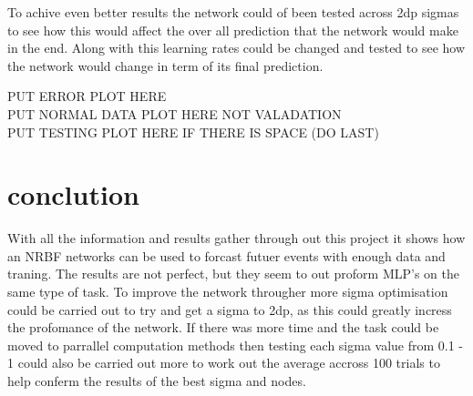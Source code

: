 \documentclass{IEEEtran}[11pt]
\begin{document}
\begin{flushleft}
 To achive even better results the network could of been tested across 2dp sigmas
 to see how this would affect the over all prediction that the network would
 make in the end. Along with this learning rates could be changed and tested to
 see how the network would change in term of its final prediction.
 \\
 \vspace{1.5mm}

  PUT ERROR PLOT HERE
  \\
  \vspace{5mm}
  PUT NORMAL DATA PLOT HERE NOT VALADATION
  \\
  \vspace{5mm}
  PUT TESTING PLOT HERE IF THERE IS SPACE (DO LAST)
\end{flushleft}

\section{conclution}
\begin{flushleft}
 With all the information and results gather through out this project it shows
 how an NRBF networks can be used to forcast futuer events with enough data and
 traning. The results are not perfect, but they seem to out proform MLP's on the
 same type of task. To improve the network througher more sigma optimisation
 could be carried out to try and get a sigma to 2dp, as this could greatly incress
 the profomance of the network. If there was more time and the task could be
 moved to parrallel computation methods then testing each sigma value from 0.1
 - 1 could also be carried out more to work out the average accross 100 trials to
 help conferm the results of the best sigma and nodes.
 \\
 \vspace{1.5mm}
\end{flushleft}
\end{document}
